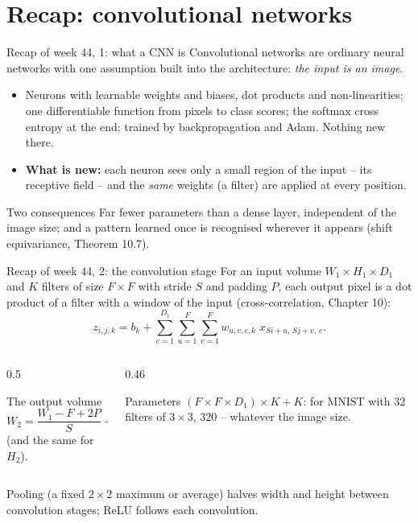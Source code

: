 \documentclass[10pt,aspectratio=169]{beamer}
\begin{document}
\section{Recap: convolutional networks}
\begin{frame}{Recap of week 44, 1: what a CNN is}
Convolutional networks are ordinary neural networks with one assumption
built into the architecture: \emph{the input is an image}.
\begin{itemize}
  \item Neurons with learnable weights and biases, dot products and
        non-linearities; one differentiable function from pixels to class
        scores; the softmax cross entropy at the end; trained by
        backpropagation and Adam.  Nothing new there.
  \item \textbf{What is new:} each neuron sees only a small region of the
        input -- its receptive field -- and the \emph{same} weights (a
        filter) are applied at every position.
\end{itemize}
\begin{block}{Two consequences}
Far fewer parameters than a dense layer, independent of the image size;
and a pattern learned once is recognised wherever it appears (shift
equivariance, Theorem 10.7).
\end{block}
\end{frame}

\begin{frame}{Recap of week 44, 2: the convolution stage}
For an input volume $W_1\times H_1\times D_1$ and $K$ filters of size
$F\times F$ with stride $S$ and padding $P$, each output pixel is a dot
product of a filter with a window of the input (cross-correlation,
Chapter 10):
\[
  z_{i,j,k}=b_k+\sum_{c=1}^{D_1}\sum_{u=1}^{F}\sum_{v=1}^{F}
  w_{u,v,c,k}\;x_{Si+u,\,Sj+v,\,c}.
\]
\begin{columns}[T]
\begin{column}{0.5\textwidth}
\begin{block}{The output volume}
\[
  W_2=\frac{W_1-F+2P}{S}+1,\qquad D_2=K
\]
(and the same for $H_2$).
\end{block}
\end{column}
\begin{column}{0.46\textwidth}
\begin{block}{Parameters}
$(F\times F\times D_1)\times K+K$: for MNIST with $32$ filters of
$3\times3$, $320$ -- whatever the image size.
\end{block}
\end{column}
\end{columns}
\medskip
Pooling (a fixed $2\times2$ maximum or average) halves width and height
between convolution stages; ReLU follows each convolution.
\end{frame}
\end{document}
